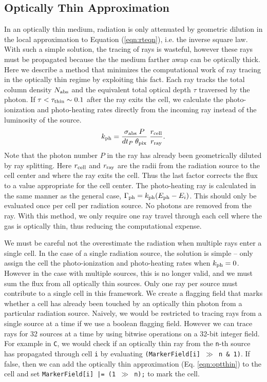 \documentclass[useAMS,usenatbib]{mn2e}
\begin{document}
\subsection{Optically Thin Approximation}

In an optically thin medium, radiation is only attenuated by geometric
dilution in the local approximation to Equation (\ref{eqn:rteqn}),
i.e. the inverse square law.  With such a simple solution, the tracing
of rays is wasteful, however these rays must be propagated because the
the medium farther awap can be optically thick.  Here we describe a
method that minimizes the computational work of ray tracing in the
optically thin regime by exploiting this fact.  Each ray tracks the
total column density $N_{\rm abs}$ and the equivalent total optical
depth $\tau$ traversed by the photon.  If $\tau < \tau_{\rm thin} \sim
0.1$ after the ray exits the cell, we calculate the photo-ionization
and photo-heating rates directly from the incoming ray instead of the
luminosity of the source.
\begin{equation}
  \label{eqn:optthin}
  k_{\rm ph} = \frac{\sigma_{\rm abs} \; P}{dt_P \; \theta_{\rm pix}}
  \; \frac{r_{\rm cell}}{r_{\rm ray}}.
\end{equation}
Note that the photon number $P$ in the ray has already been
geometrically diluted by ray splitting.  Here $r_{\rm cell}$ and
$r_{\rm ray}$ are the radii from the radiation source to the cell
center and where the ray exits the cell.  Thus the last factor
corrects the flux to a value appropriate for the cell center.  The
photo-heating ray is calculated in the same manner as the general
case, $\Gamma_{\rm ph} = k_{\rm ph} (E_{\rm ph} - E_i)$.  This should
only be evaluated once per cell per radiation source.  No photons are
removed from the ray.  With this method, we only require one ray
travel through each cell where the gas is optically thin, thus
reducing the computational expense.

We must be careful not the overestimate the radiation when multiple
rays enter a single cell.  In the case of a single radiation source,
the solution is simple -- only assign the cell the photo-ionization
and photo-heating rates when $k_{\rm ph} = 0$.  However in the case
with multiple sources, this is no longer valid, and we must sum the
flux from all optically thin sources.  Only one ray per source must
contribute to a single cell in this framework.  We create a flagging
field that marks whether a cell has already been touched by an
optically thin photon from a particular radiation source.  Naively, we
would be restricted to tracing rays from a single source at a time if
we use a boolean flagging field.  However we can trace rays for 32
sources at a time by using bitwise operations on a 32-bit integer
field.  For example in \texttt{C}, we would check if an optically thin
ray from the \texttt{n}-th source has propagated through cell
\texttt{i} by evaluating \texttt{(MarkerField[i] $\gg$ n \& 1)}.  If
false, then we can add the optically thin approximation
(Eq. \ref{eqn:optthin}) to the cell and set \texttt{MarkerField[i] |=
  (1 $\gg$ n);} to mark the cell.
\end{document}
